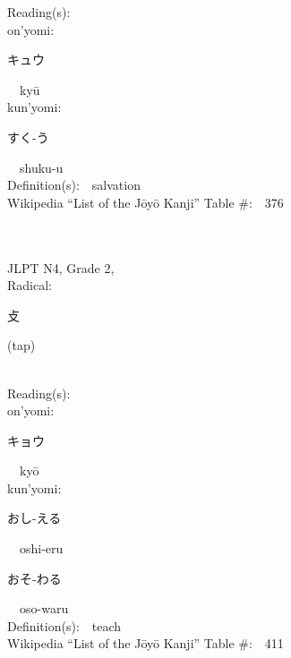 \begin{multicols}{2}
Reading(s):\ \ \\
{\hspace*{1em}}on'yomi:\ \ \\
{\hspace*{2em}}{\begin{CJK}{UTF8}{min} キュウ \end{CJK}}\ \ ky\=u\ \ \\
{\hspace*{1em}}kun'yomi:\ \ \\
{\hspace*{2em}}{\begin{CJK}{UTF8}{min} すく-う \end{CJK}}\ \ shuku-u\ \ \\
Definition(s):\ \ salvation \\
Wikipedia ``List of the J\=oy\=o Kanji'' Table \#:\ \ 376 \\
\ \ \\
{\fontsize{34pt}{40pt}  }\ \ \\  %
{JLPT N4, Grade 2, \\Radical:\ \ {\begin{CJK}{UTF8}{min} 攴 \end{CJK}} (tap) } \\
Reading(s):\ \ \\
{\hspace*{1em}}on'yomi:\ \ \\
{\hspace*{2em}}{\begin{CJK}{UTF8}{min} キョウ \end{CJK}}\ \ ky\=o\ \ \\
{\hspace*{1em}}kun'yomi:\ \ \\
{\hspace*{2em}}{\begin{CJK}{UTF8}{min} おし-える \end{CJK}}\ \ oshi-eru\ \ \\
{\hspace*{2em}}{\begin{CJK}{UTF8}{min} おそ-わる \end{CJK}}\ \ oso-waru\ \ \\
Definition(s):\ \ teach \\
Wikipedia ``List of the J\=oy\=o Kanji'' Table \#:\ \ 411 \\

\end{multicols}

